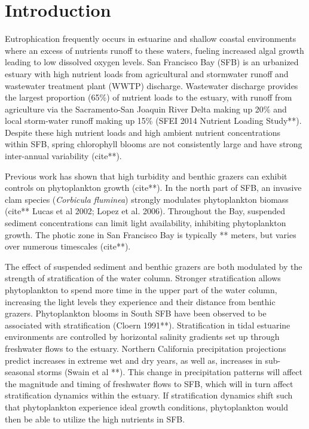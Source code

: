 \documentclass[preprint,review,12pt]{elsarticle}
\begin{document}
\section{Introduction}\label{S:intro}
Eutrophication frequently occurs in estuarine and shallow coastal environments where an excess of nutrients runoff to these waters, fueling increased algal growth leading to low dissolved oxygen levels. San Francisco Bay (SFB) is an urbanized estuary with high nutrient loads from agricultural and stormwater runoff and wastewater treatment plant (WWTP) discharge. Wastewater discharge provides the largest proportion (65\%) of nutrient loads to the estuary, with runoff from agriculture via the Sacramento-San Joaquin River Delta making up 20\% and local storm-water runoff making up 15\% (SFEI 2014 Nutrient Loading Study**). Despite these high nutrient loads and high ambient nutrient concentrations within SFB, spring chlorophyll blooms are not consistently large and have strong inter-annual variability (cite**). 

Previous work has shown that high turbidity and benthic grazers can exhibit controls on phytoplankton growth (cite**). In the north part of SFB, an invasive clam species (\textit{Corbicula fluminea}) strongly modulates phytoplankton biomass (cite** Lucas et al 2002; Lopez et al. 2006). Throughout the Bay, suspended sediment concentrations can limit light availability, inhibiting phytoplankton growth. The photic zone in San Francisco Bay is typically ** meters, but varies over numerous timescales (cite**).  

The effect of suspended sediment and benthic grazers are both modulated by the strength of stratification of the water column. Stronger stratification allows phytoplankton to spend more time in the upper part of the water column, increasing the light levels they experience and their distance from benthic grazers. Phytoplankton blooms in South SFB have been observed to be associated with stratification (Cloern 1991**). Stratification in tidal estuarine environments are controlled by horizontal salinity gradients set up through freshwater flows to the estuary. Northern California precipitation projections predict increases in extreme wet and dry years, as well as, increases in sub-seasonal storms (Swain et al **). This change in precipitation patterns will affect the magnitude and timing of freshwater flows to SFB, which will in turn affect stratification dynamics within the estuary. If stratification dynamics shift such that phytoplankton experience ideal growth conditions, phytoplankton would then be able to utilize the high nutrients in SFB.
\end{document}
